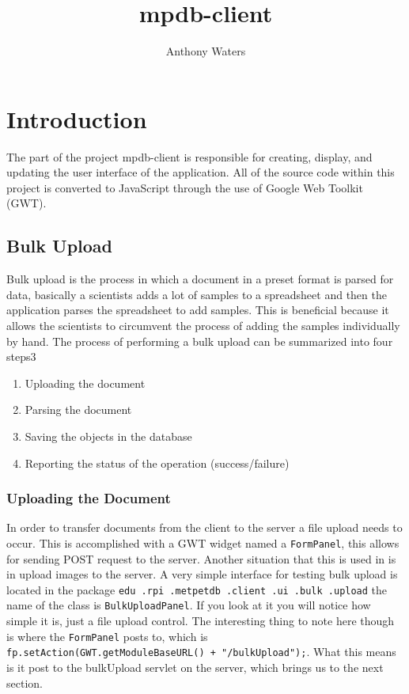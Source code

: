 \documentclass[10pt,letterpaper,onecolumn,oneside]{report}
\begin{document}
\title{mpdb-client}
\author{Anthony Waters}
\maketitle
\tableofcontents
\newpage
\part{Introduction}
The part of the project mpdb-client is responsible for creating, display, and updating the user interface of the application.  All of the source code within this project is converted to JavaScript through the use of Google Web Toolkit (GWT).
\chapter{Bulk Upload}
Bulk upload is the process in which a document in a preset format is parsed for data, basically a scientists adds a lot of samples to a spreadsheet and then the application parses the spreadsheet to add samples.  This is beneficial because it allows the scientists to circumvent the process of adding the samples individually by hand.  The process of performing a bulk upload can be summarized into four steps3
\begin{enumerate}
\item Uploading the document
\item Parsing the document
\item Saving the objects in the database
\item Reporting the status of the operation (success/failure)
\end{enumerate}
\section{Uploading the Document}
In order to transfer documents from the client to the server a file upload needs to occur.  This is accomplished with a GWT widget named a
\texttt{FormPanel}, this allows for sending POST request to the server.  Another situation that this is used in is in upload images to the server.  A very simple interface for testing bulk upload is located in the package 
\texttt{edu\ .rpi\ .metpetdb\ .client\ .ui\ .bulk\ .upload} the name of the class is
\texttt{BulkUploadPanel}.  If you look at it you will notice how simple it is, just a file upload control.  The interesting thing to note here though is where the \texttt{FormPanel} posts to, which is \texttt{fp.setAction(GWT.getModuleBaseURL() + "/bulkUpload");}.  What this means is it post to the bulkUpload servlet on the server, which brings us to the next section.
\end{document}
